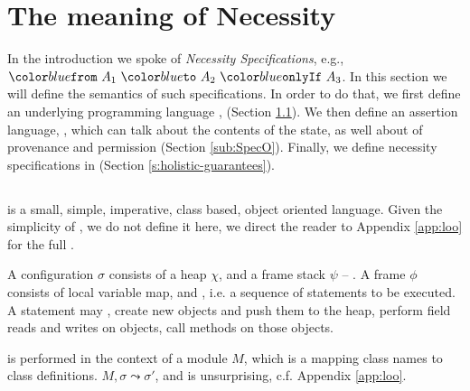 \section{The meaning of Necessity}
\label{s:semantics}

In the introduction we spoke of \emph{Necessity Specifications}, e.g., $\onlyIf {A_1} {A_2} {A_3}$. 
In this section we will define the semantics of such specifications.
In order to do that, we first define 
an underlying programming language \Loo, (Section \ref{sub:Loo}).
We then  define an assertion language, \SpecO,  which can talk about
 the contents of the state, as well about 
  of provenance and permission (Section \ref{sub:SpecO}).
Finally, we define necessity specifications in \Chainmail (Section \ref{s:holistic-guarantees}).



\subsection{\Loo}
\label{sub:Loo} 
 \Loo is a small, simple, imperative,
class based, object oriented language. 
Given the simplicity of \Loo, we do not
define it here,  we direct the reader to Appendix \ref{app:loo} for 
the full . %

A \Loo configuration $\sigma$ consists of a 
heap $\chi$, and a frame stack $\psi$ --
.    
A frame $\phi$ consists of
local variable map, and , i.e. a sequence of statements to be executed.
 A statement may , create new objects and push them to the heap, 
perform field reads and writes on objects,  
 call methods on those objects. 

 is performed in the context of a module $M$,
which is a mapping
 class names to class definitions. 
  $M, \sigma \leadsto \sigma'$, and is
unsurprising,  c.f. Appendix \ref{app:loo}.
 
